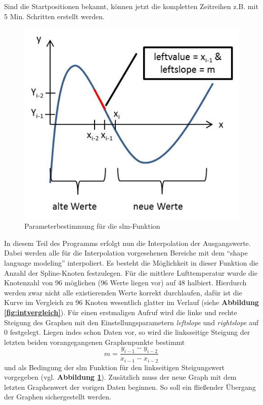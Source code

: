 
Sind die Startpositionen bekannt, können jetzt die kompletten Zeitreihen z.B. mit 5 Min. Schritten erstellt werden.       

\begin{figure}[!h]
\centering
\includegraphics[scale=0.7]{programm/slm}
\caption{Parameterbestimmung für die slm-Funktion}
\label{fig:slm}
\end{figure}
In diesem Teil des Programms erfolgt nun die Interpolation der Ausgangswerte. Dabei werden alle für die Interpolation vorgesehenen Bereiche mit dem \enquote{shape language modeling} \cite{SLM} interpoliert. Es besteht die Möglichkeit in dieser Funktion die Anzahl der Spline-Knoten festzulegen. Für die mittlere Lufttemperatur wurde die Knotenzahl von 96 möglichen (96 Werte liegen vor) auf 48 halbiert. Hierdurch werden zwar nicht alle existierenden Werte korrekt durchlaufen, dafür ist die Kurve im Vergleich zu 96 Knoten wesentlich glatter im Verlauf (siehe \textbf{Abbildung \ref{fig:intvergleich}}). Für einen erstmaligen Aufruf wird die linke und rechte Steigung des Graphen mit den Einstellungsparametern \textit{leftslope} und \textit{rightslope} auf 0 festgelegt. Liegen indes schon Daten vor, so wird die linksseitige Steigung der letzten beiden vorangegangenen Graphenpunkte bestimmt 
\begin{equation}
m = \frac{y_{i-1}-y_{i-2}}{x_{i-1}-x_{i-2}}
\end{equation} 
und als Bedingung der \textsf{slm} Funktion für den linkseitigen Steigungswert vorgegeben (vgl. \textbf{Abbildung \ref{fig:slm}}). Zusätzlich muss der neue Graph mit dem letzten Graphenwert der vorigen Daten beginnen. So soll ein fließender Übergang der Graphen sichergestellt werden. 
